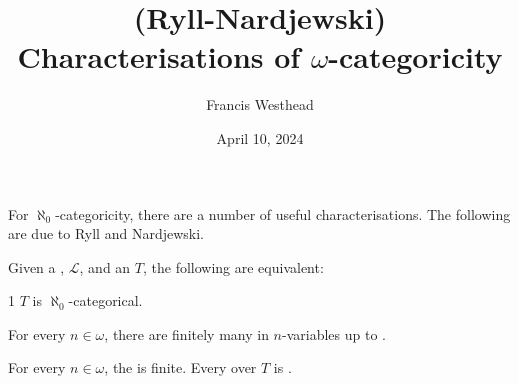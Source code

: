 \documentclass[a4paper]{article}
\title{(Ryll-Nardjewski) Characterisations of \(\omega\)-categoricity}
\date{April 10, 2024}
\author{Francis Westhead}
\begin{document}
\maketitle
\par{For \(\aleph _0\)-categoricity, there are a number of useful characterisations. The following are due to Ryll and Nardjewski.}\par{Given a , \(\mathcal {L}\), and an  \(T\), the following are equivalent:}\par{1 \(T\) is \(\aleph _0\)-categorical.}\par{For every \(n \in   \omega\), there are finitely many  in \(n\)-variables up to .}\par{For every \(n \in   \omega\), the  is finite. 
Every  over \(T\) is . }
\printbibliography
\end{document}
